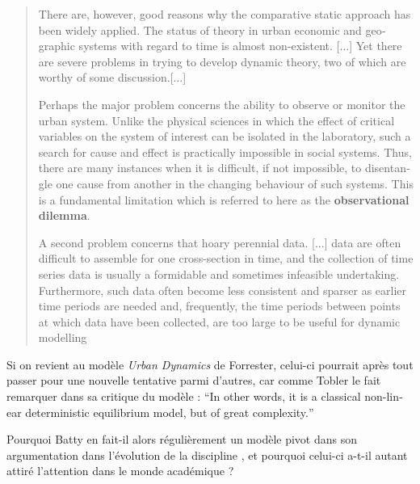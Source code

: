 \foreignblockquote{english}[{\cite[296-297]{Batty1976}}]{There are, however, good reasons why the comparative static approach has been widely applied. The status of theory in urban economic and geographic systems with regard to time is almost non-existent. [...] Yet there are severe problems in trying to develop dynamic theory, two of which are worthy of some discussion.[...]

Perhaps the major problem concerns the ability to observe or monitor the urban system. Unlike the physical sciences in which the effect of critical variables on the system of interest can be isolated in the laboratory, such a search for cause and effect is practically impossible in social systems. Thus, there are many instances when it is difficult, if not impossible, to disentangle one cause from another in the changing behaviour of such systems. This is a fundamental limitation which is referred to here as the \textbf{observational dilemma}.

A second problem concerns that hoary perennial data. [...] data are often difficult to assemble for one cross-section in time, and the collection of time series data is usually a formidable and sometimes infeasible undertaking. Furthermore, such data often become less consistent and sparser as earlier time periods are needed and, frequently, the time periods between points at which data have been collected, are too large to be useful for dynamic modelling}


Si on revient au modèle \textit{Urban Dynamics} de Forrester, celui-ci pourrait après tout passer pour une nouvelle tentative parmi d'autres, car comme Tobler le fait remarquer dans sa critique du modèle : \foreignquote{english}{In other words, it is a classical non-linear deterministic equilibrium model, but of great complexity.} \textcite{Tobler1970a}

Pourquoi Batty en fait-il alors régulièrement un modèle pivot dans son argumentation dans l'évolution de la discipline \textcite{Batty1971, Batty1976, Batty2001, Batty2008}, et pourquoi celui-ci a-t-il autant attiré l'attention dans le monde académique ?

